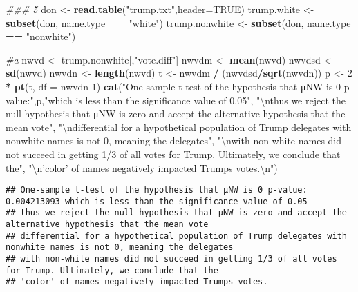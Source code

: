\documentclass[]{article}
\newenvironment{Shaded}{\begin{snugshade}}{\end{snugshade}}
\newcommand{\CharTok}[1]{\textcolor[rgb]{0.31,0.60,0.02}{#1}}
\newcommand{\CommentTok}[1]{\textcolor[rgb]{0.56,0.35,0.01}{\textit{#1}}}
\newcommand{\DataTypeTok}[1]{\textcolor[rgb]{0.13,0.29,0.53}{#1}}
\newcommand{\DecValTok}[1]{\textcolor[rgb]{0.00,0.00,0.81}{#1}}
\newcommand{\KeywordTok}[1]{\textcolor[rgb]{0.13,0.29,0.53}{\textbf{#1}}}
\newcommand{\NormalTok}[1]{#1}
\newcommand{\OperatorTok}[1]{\textcolor[rgb]{0.81,0.36,0.00}{\textbf{#1}}}
\newcommand{\OtherTok}[1]{\textcolor[rgb]{0.56,0.35,0.01}{#1}}
\newcommand{\StringTok}[1]{\textcolor[rgb]{0.31,0.60,0.02}{#1}}
\begin{document}
\begin{Shaded}
\begin{Highlighting}[]
\CommentTok{### 5}
\NormalTok{don <-}\StringTok{ }\KeywordTok{read.table}\NormalTok{(}\StringTok{"trump.txt"}\NormalTok{,}\DataTypeTok{header=}\OtherTok{TRUE}\NormalTok{)}
\NormalTok{trump.white <-}\StringTok{ }\KeywordTok{subset}\NormalTok{(don, name.type }\OperatorTok{==}\StringTok{ "white"}\NormalTok{)}
\NormalTok{trump.nonwhite <-}\StringTok{ }\KeywordTok{subset}\NormalTok{(don, name.type }\OperatorTok{==}\StringTok{ "nonwhite"}\NormalTok{)}

\CommentTok{#a}
\NormalTok{nwvd <-}\StringTok{ }\NormalTok{trump.nonwhite[,}\StringTok{"vote.diff"}\NormalTok{]}
\NormalTok{nwvdm <-}\StringTok{ }\KeywordTok{mean}\NormalTok{(nwvd)}
\NormalTok{nwvdsd <-}\StringTok{ }\KeywordTok{sd}\NormalTok{(nwvd)}
\NormalTok{nwvdn <-}\StringTok{ }\KeywordTok{length}\NormalTok{(nwvd)}
\NormalTok{t <-}\StringTok{ }\NormalTok{nwvdm }\OperatorTok{/}\StringTok{ }\NormalTok{(nwvdsd}\OperatorTok{/}\KeywordTok{sqrt}\NormalTok{(nwvdn))}
\NormalTok{p <-}\StringTok{ }\DecValTok{2} \OperatorTok{*}\StringTok{ }\KeywordTok{pt}\NormalTok{(t, }\DataTypeTok{df =}\NormalTok{ nwvdn}\DecValTok{-1}\NormalTok{)}
\KeywordTok{cat}\NormalTok{(}\StringTok{"One-sample t-test of the hypothesis that μNW is 0 p-value:"}\NormalTok{,p,}\StringTok{"which is less than the significance value of 0.05"}\NormalTok{,}
    \StringTok{"}\CharTok{\textbackslash{}n}\StringTok{thus we reject the null hypothesis that μNW is zero and accept the alternative hypothesis that the mean vote"}\NormalTok{,}
    \StringTok{"}\CharTok{\textbackslash{}n}\StringTok{differential for a hypothetical population of Trump delegates with nonwhite names is not 0, meaning the delegates"}\NormalTok{,}
    \StringTok{"}\CharTok{\textbackslash{}n}\StringTok{with non-white names did not succeed in getting 1/3 of all votes for Trump. Ultimately, we conclude that the"}\NormalTok{,}
    \StringTok{"}\CharTok{\textbackslash{}n}\StringTok{'color' of names negatively impacted Trumps votes.}\CharTok{\textbackslash{}n}\StringTok{"}\NormalTok{)}
\end{Highlighting}
\end{Shaded}

\begin{verbatim}
## One-sample t-test of the hypothesis that μNW is 0 p-value: 0.004213093 which is less than the significance value of 0.05 
## thus we reject the null hypothesis that μNW is zero and accept the alternative hypothesis that the mean vote 
## differential for a hypothetical population of Trump delegates with nonwhite names is not 0, meaning the delegates 
## with non-white names did not succeed in getting 1/3 of all votes for Trump. Ultimately, we conclude that the 
## 'color' of names negatively impacted Trumps votes.
\end{verbatim}
\end{document}
